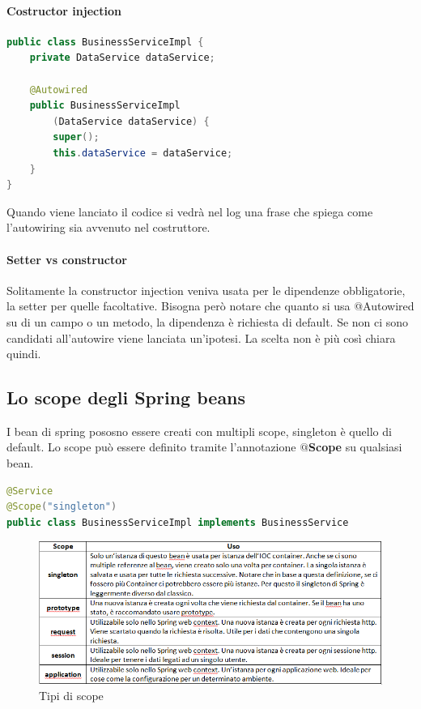 \documentclass[11pt,a4paper]{book}
\begin{document}
\paragraph{Costructor injection}
\begin{lstlisting}[language = Java]
public class BusinessServiceImpl {
	private DataService dataService;

	@Autowired
	public BusinessServiceImpl
		(DataService dataService) {
		super();
		this.dataService = dataService;
	}
}
\end{lstlisting}
Quando viene lanciato il codice si vedrà nel log una frase che spiega come l'autowiring sia avvenuto nel costruttore.
\paragraph{Setter vs constructor}
Solitamente la constructor injection veniva usata per le dipendenze obbligatorie, la setter per quelle facoltative. Bisogna però notare che quanto si usa @Autowired su di un campo o un metodo, la dipendenza è richiesta di default. Se non ci sono candidati all'autowire viene lanciata un'ipotesi. La scelta non è più così chiara quindi.

\subsection{Lo scope degli Spring beans}
I bean di spring pososno essere creati con multipli scope, singleton è quello di default. Lo scope può essere definito tramite l'annotazione \textbf{$@$Scope} su qualsiasi bean.
\begin{lstlisting}[language = Java]
@Service
@Scope("singleton")
public class BusinessServiceImpl implements BusinessService
\end{lstlisting}
\begin{figure}[h!]
	\begin{center}
		\includegraphics[scale=0.6]{img/023.png}
		\caption{Tipi di scope}
		\label{fig: 023}
	\end{center}
\end{figure}
\end{document}
